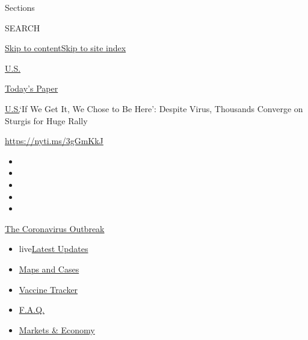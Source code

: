 Sections

SEARCH

\protect\hyperlink{site-content}{Skip to
content}\protect\hyperlink{site-index}{Skip to site index}

\href{https://www.nytimes.com/section/us}{U.S.}

\href{https://myaccount.nytimes.com/auth/login?response_type=cookie\&client_id=vi}{}

\href{https://www.nytimes.com/section/todayspaper}{Today's Paper}

\href{/section/us}{U.S.}\textbar{}`If We Get It, We Chose to Be Here':
Despite Virus, Thousands Converge on Sturgis for Huge Rally

\href{https://nyti.ms/3gGmKkJ}{https://nyti.ms/3gGmKkJ}

\begin{itemize}
\item
\item
\item
\item
\item
\end{itemize}

\href{https://www.nytimes.com/news-event/coronavirus?action=click\&pgtype=Article\&state=default\&region=TOP_BANNER\&context=storylines_menu}{The
Coronavirus Outbreak}

\begin{itemize}
\tightlist
\item
  live\href{https://www.nytimes.com/2020/08/08/world/coronavirus-updates.html?action=click\&pgtype=Article\&state=default\&region=TOP_BANNER\&context=storylines_menu}{Latest
  Updates}
\item
  \href{https://www.nytimes.com/interactive/2020/us/coronavirus-us-cases.html?action=click\&pgtype=Article\&state=default\&region=TOP_BANNER\&context=storylines_menu}{Maps
  and Cases}
\item
  \href{https://www.nytimes.com/interactive/2020/science/coronavirus-vaccine-tracker.html?action=click\&pgtype=Article\&state=default\&region=TOP_BANNER\&context=storylines_menu}{Vaccine
  Tracker}
\item
  \href{https://www.nytimes.com/interactive/2020/world/coronavirus-tips-advice.html?action=click\&pgtype=Article\&state=default\&region=TOP_BANNER\&context=storylines_menu}{F.A.Q.}
\item
  \href{https://www.nytimes.com/live/2020/08/07/business/stock-market-today-coronavirus?action=click\&pgtype=Article\&state=default\&region=TOP_BANNER\&context=storylines_menu}{Markets
  \& Economy}
\end{itemize}

